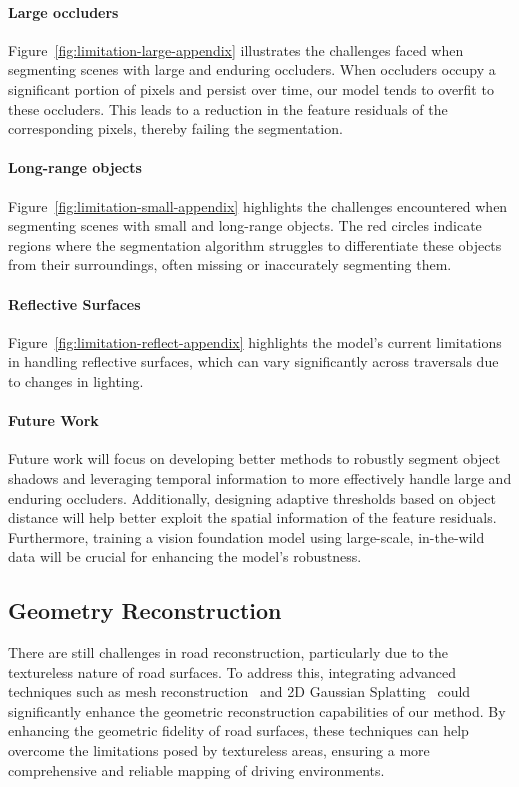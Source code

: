  \paragraph{Large occluders} Figure~\ref{fig:limitation-large-appendix} illustrates the challenges faced when segmenting scenes with large and enduring occluders. When occluders occupy a significant portion of pixels and persist over time, our model tends to overfit to these occluders. This leads to a reduction in the feature residuals of the corresponding pixels, thereby failing the segmentation.

 \paragraph{Long-range objects} Figure~\ref{fig:limitation-small-appendix} highlights the challenges encountered when segmenting scenes with small and long-range objects. The red circles indicate regions where the segmentation algorithm struggles to differentiate these objects from their surroundings, often missing or inaccurately segmenting them. 

\paragraph{Reflective Surfaces} Figure~\ref{fig:limitation-reflect-appendix}  highlights the model's current limitations in handling reflective surfaces, which can vary significantly across traversals due to changes in lighting.
 
 \paragraph{Future Work} Future work will focus on developing better methods to robustly segment object shadows and leveraging temporal information to more effectively handle large and enduring occluders. Additionally, designing adaptive thresholds based on object distance will help better exploit the spatial information of the feature residuals. Furthermore, training a vision foundation model using large-scale, in-the-wild data will be crucial for enhancing the model's robustness.

\subsection{Geometry Reconstruction}

There are still challenges in road reconstruction, particularly due to the textureless nature of road surfaces. To address this, integrating advanced techniques such as mesh reconstruction~\cite{guedon2023sugar} and 2D Gaussian Splatting~\cite{Huang2DGS2024} could significantly enhance the geometric reconstruction capabilities of our method.  By enhancing the geometric fidelity of road surfaces, these techniques can help overcome the limitations posed by textureless areas, ensuring a more comprehensive and reliable mapping of driving environments.

